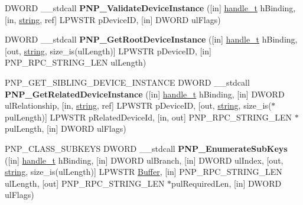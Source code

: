 \begin{DoxyCompactItemize}
\item 
\mbox{\label{interfacepnp_afcafce5541030e37c724c565b79251d1}} 
D\+W\+O\+RD \+\_\+\+\_\+stdcall {\bfseries P\+N\+P\+\_\+\+Validate\+Device\+Instance} (\mbox{[}in\mbox{]} \hyperlink{interfacevoid}{handle\+\_\+t} h\+Binding, \mbox{[}in, \hyperlink{structstring}{string}, ref\mbox{]} L\+P\+W\+S\+TR p\+Device\+ID, \mbox{[}in\mbox{]} D\+W\+O\+RD ul\+Flags)
\item 
\mbox{\label{interfacepnp_a530c46059c410797a82fd803f2c7bd11}} 
D\+W\+O\+RD \+\_\+\+\_\+stdcall {\bfseries P\+N\+P\+\_\+\+Get\+Root\+Device\+Instance} (\mbox{[}in\mbox{]} \hyperlink{interfacevoid}{handle\+\_\+t} h\+Binding, \mbox{[}out, \hyperlink{structstring}{string}, size\+\_\+is(ul\+Length)\mbox{]} L\+P\+W\+S\+TR p\+Device\+ID, \mbox{[}in\mbox{]} P\+N\+P\+\_\+\+R\+P\+C\+\_\+\+S\+T\+R\+I\+N\+G\+\_\+\+L\+EN ul\+Length)
\item 
\mbox{\label{interfacepnp_aa456dfd4aac387abc3721248277b3e71}} 
P\+N\+P\+\_\+\+G\+E\+T\+\_\+\+S\+I\+B\+L\+I\+N\+G\+\_\+\+D\+E\+V\+I\+C\+E\+\_\+\+I\+N\+S\+T\+A\+N\+CE D\+W\+O\+RD \+\_\+\+\_\+stdcall {\bfseries P\+N\+P\+\_\+\+Get\+Related\+Device\+Instance} (\mbox{[}in\mbox{]} \hyperlink{interfacevoid}{handle\+\_\+t} h\+Binding, \mbox{[}in\mbox{]} D\+W\+O\+RD ul\+Relationship, \mbox{[}in, \hyperlink{structstring}{string}, ref\mbox{]} L\+P\+W\+S\+TR p\+Device\+ID, \mbox{[}out, \hyperlink{structstring}{string}, size\+\_\+is($\ast$pul\+Length)\mbox{]} L\+P\+W\+S\+TR p\+Related\+Device\+Id, \mbox{[}in, out\mbox{]} P\+N\+P\+\_\+\+R\+P\+C\+\_\+\+S\+T\+R\+I\+N\+G\+\_\+\+L\+EN $\ast$pul\+Length, \mbox{[}in\mbox{]} D\+W\+O\+RD ul\+Flags)
\item 
\mbox{\label{interfacepnp_a5814433430f0295e976c710c31696086}} 
P\+N\+P\+\_\+\+C\+L\+A\+S\+S\+\_\+\+S\+U\+B\+K\+E\+YS D\+W\+O\+RD \+\_\+\+\_\+stdcall {\bfseries P\+N\+P\+\_\+\+Enumerate\+Sub\+Keys} (\mbox{[}in\mbox{]} \hyperlink{interfacevoid}{handle\+\_\+t} h\+Binding, \mbox{[}in\mbox{]} D\+W\+O\+RD ul\+Branch, \mbox{[}in\mbox{]} D\+W\+O\+RD ul\+Index, \mbox{[}out, \hyperlink{structstring}{string}, size\+\_\+is(ul\+Length)\mbox{]} L\+P\+W\+S\+TR \hyperlink{class_buffer}{Buffer}, \mbox{[}in\mbox{]} P\+N\+P\+\_\+\+R\+P\+C\+\_\+\+S\+T\+R\+I\+N\+G\+\_\+\+L\+EN ul\+Length, \mbox{[}out\mbox{]} P\+N\+P\+\_\+\+R\+P\+C\+\_\+\+S\+T\+R\+I\+N\+G\+\_\+\+L\+EN $\ast$pul\+Required\+Len, \mbox{[}in\mbox{]} D\+W\+O\+RD ul\+Flags)

\end{DoxyCompactItemize}
